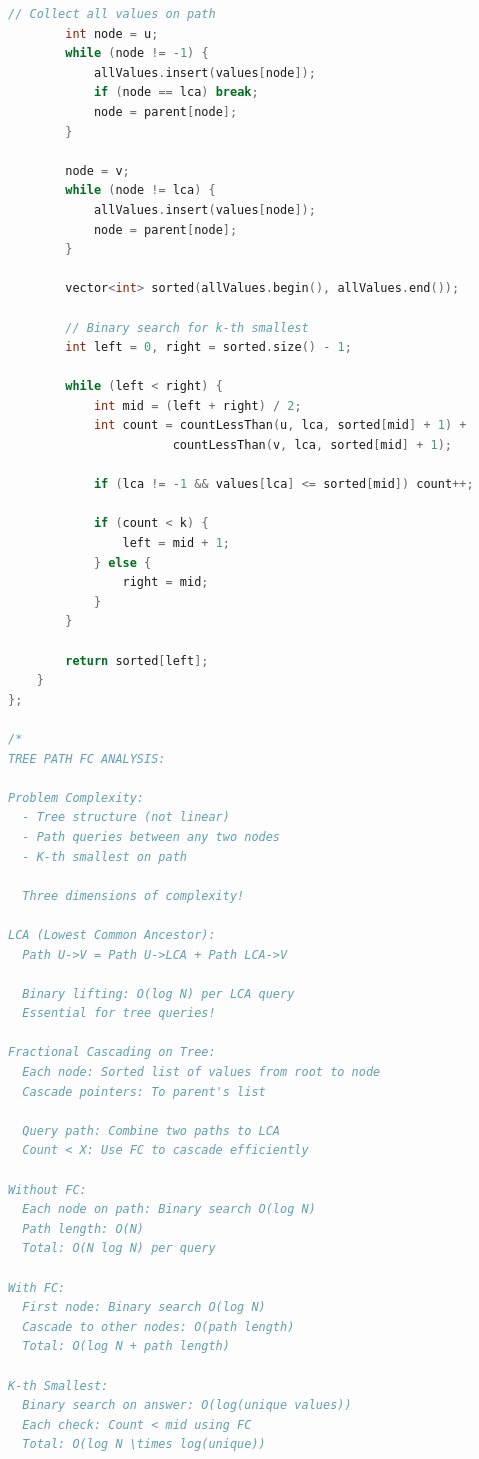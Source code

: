 \documentclass[11pt,a4paper,oneside]{book}
\begin{document}
\begin{lstlisting}[language=C++, caption=Tree Path FC Solutions - Problems 5-7]
        // Collect all values on path
        int node = u;
        while (node != -1) {
            allValues.insert(values[node]);
            if (node == lca) break;
            node = parent[node];
        }
        
        node = v;
        while (node != lca) {
            allValues.insert(values[node]);
            node = parent[node];
        }
        
        vector<int> sorted(allValues.begin(), allValues.end());
        
        // Binary search for k-th smallest
        int left = 0, right = sorted.size() - 1;
        
        while (left < right) {
            int mid = (left + right) / 2;
            int count = countLessThan(u, lca, sorted[mid] + 1) +
                       countLessThan(v, lca, sorted[mid] + 1);
            
            if (lca != -1 && values[lca] <= sorted[mid]) count++;
            
            if (count < k) {
                left = mid + 1;
            } else {
                right = mid;
            }
        }
        
        return sorted[left];
    }
};

/*
TREE PATH FC ANALYSIS:

Problem Complexity:
  - Tree structure (not linear)
  - Path queries between any two nodes
  - K-th smallest on path
  
  Three dimensions of complexity!

LCA (Lowest Common Ancestor):
  Path U->V = Path U->LCA + Path LCA->V
  
  Binary lifting: O(log N) per LCA query
  Essential for tree queries!

Fractional Cascading on Tree:
  Each node: Sorted list of values from root to node
  Cascade pointers: To parent's list
  
  Query path: Combine two paths to LCA
  Count < X: Use FC to cascade efficiently

Without FC:
  Each node on path: Binary search O(log N)
  Path length: O(N)
  Total: O(N log N) per query

With FC:
  First node: Binary search O(log N)
  Cascade to other nodes: O(path length)
  Total: O(log N + path length)

K-th Smallest:
  Binary search on answer: O(log(unique values))
  Each check: Count < mid using FC
  Total: O(log N \times log(unique))


\end{lstlisting}
\end{document}
